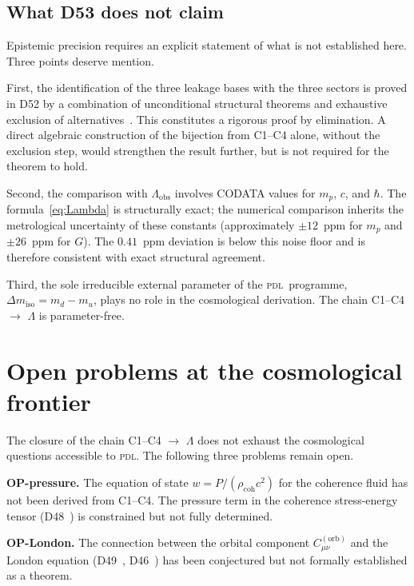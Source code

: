 \documentclass[12pt,a4paper]{article}
\theoremstyle{plain}
\theoremstyle{definition}
\theoremstyle{remark}
\newcommand{\hb}{\hbar}
\newcommand{\PDL}{\textsc{pdl}}
\newcommand{\Lam}{\Lambda}
\begin{document}
\subsection{What D53 does not claim}
\label{subsec:noclaim}

Epistemic precision requires an explicit statement of what is not established here. Three points deserve mention.

First, the identification of the three leakage bases with the three sectors is proved in D52 by a combination of unconditional structural theorems and exhaustive exclusion of alternatives~\cite{PDL_D52_2026}. This constitutes a rigorous proof by elimination. A direct algebraic construction of the bijection from C1--C4 alone, without the exclusion step, would strengthen the result further, but is not required for the theorem to hold.

Second, the comparison with $\Lam_{\mathrm{obs}}$ involves CODATA values for $m_p$, $c$, and $\hb$. The formula~\eqref{eq:Lambda} is structurally exact; the numerical comparison inherits the metrological uncertainty of these constants (approximately $\pm 12$~ppm for $m_p$ and $\pm 26$~ppm for $G$). The $0.41$~ppm deviation is below this noise floor and is therefore consistent with exact structural agreement.

Third, the sole irreducible external parameter of the \PDL\ programme, $\Delta m_{\mathrm{iso}} = m_d - m_u$, plays no role in the cosmological derivation. The chain C1--C4 $\to$ $\Lam$ is parameter-free.

\section{Open problems at the cosmological frontier}
\label{sec:open}

The closure of the chain C1--C4 $\to$ $\Lam$ does not exhaust the cosmological questions accessible to \PDL. The following three problems remain open.

\textbf{OP-pressure.} The equation of state $w = P/(\rho_{\mathrm{coh}} c^2)$ for the coherence fluid has not been derived from C1--C4. The pressure term in the coherence stress-energy tensor (D48~\cite{PDL_D48_2026}) is constrained but not fully determined.

\textbf{OP-London.} The connection between the orbital component $C^{(\mathrm{orb})}_{\mu\nu}$ and the London equation (D49~\cite{PDL_D49_2026}, D46~\cite{PDL_D46_2026}) has been conjectured but not formally established as a theorem.
\end{document}
